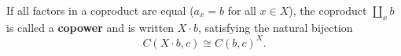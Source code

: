 If all factors in a coproduct are equal ($a_x = b$ for all $x \in X$), the coproduct $\coprod_x b$ is called a \textbf{copower} and is written $X \cdot b$, satisfying the natural bijection
$$C(X \cdot b, c) \cong C(b, c)^X.$$